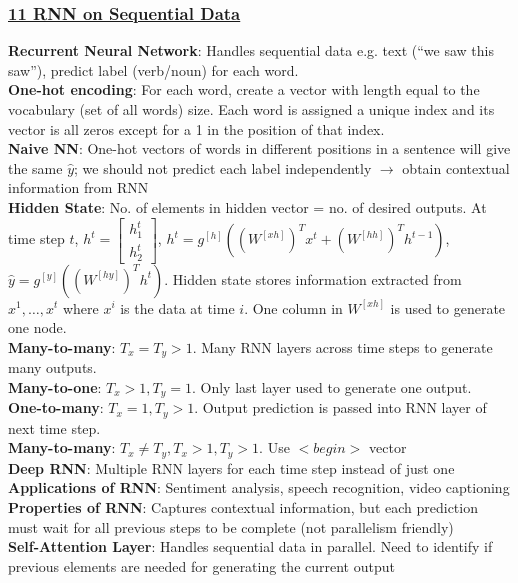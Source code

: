 \documentclass{article}
\begin{document}
{\begin{multicols*}{3}
\subsubsection*{\underline{11 RNN on Sequential Data}}
\textbf{Recurrent Neural Network}: Handles sequential data e.g. text (``we saw this saw''), predict label (verb/noun) for each word. \\
\textbf{One-hot encoding}: For each word, create a vector with length equal to the vocabulary (set of all words) size. Each word is assigned a unique index and its vector is all zeros except for a 1 in the position of that index. \\
\textbf{Naive NN}: One-hot vectors of words in different positions in a sentence will give the same $\hat{y}$; we should not predict each label independently $\to$ obtain contextual information from RNN\\
\textbf{Hidden State}: No. of elements in hidden vector = no. of desired outputs. At time step $t$, $h^t=\begin{bmatrix}
    h_1^t\\h_2^t
\end{bmatrix}$, $h^t=g^{[h]}((W^{[xh]})^Tx^t+(W^{[hh]})^Th^{t-1})$, $\hat{y}=g^{[y]}((W^{[hy]})^Th^t)$. Hidden state stores information extracted from $x^1,\dots,x^{t}$ where $x^i$ is the data at time $i$. One column in $W^{[xh]}$ is used to generate one node. \\
\textbf{Many-to-many}: $T_x=T_y>1$. Many RNN layers across time steps to generate many outputs. \\
\textbf{Many-to-one}: $T_x>1, T_y=1$. Only last layer used to generate one output. \\
\textbf{One-to-many}: $T_x=1, T_y>1$. Output prediction is passed into RNN layer of next time step. \\
\textbf{Many-to-many}: $T_x\not=T_y, T_x>1, T_y>1$. Use $<begin>$ vector \\
\textbf{Deep RNN}: Multiple RNN layers for each time step instead of just one \\
\textbf{Applications of RNN}: Sentiment analysis, speech recognition, video captioning\\
\textbf{Properties of RNN}: Captures contextual information, but each prediction must wait for all previous steps to be complete (not parallelism friendly) \\
\textbf{Self-Attention Layer}: Handles sequential data in parallel. Need to identify if previous elements are needed for generating the current output \\

\end{multicols*}}
\end{document}
